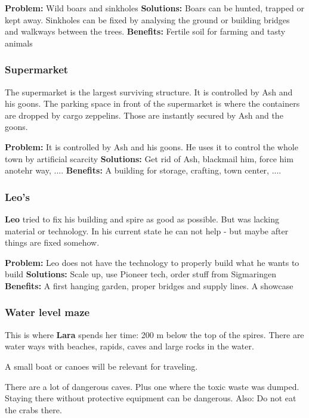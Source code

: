 \textbf{Problem:} Wild boars and sinkholes
\textbf{Solutions:} Boars can be hunted, trapped or kept away. Sinkholes can be fixed by analysing the ground or building bridges and walkways between the trees. 
\textbf{Benefits:} Fertile soil for farming and tasty animals

\subsubsection{Supermarket}

The supermarket is the largest surviving structure. It is controlled by Ash and his goons. The parking space in front of the supermarket is where the containers are dropped by cargo zeppelins. Those are instantly secured by Ash and the goons.

\textbf{Problem:} It is controlled by Ash and his goons. He uses it to control the whole town by artificial scarcity
\textbf{Solutions:} Get rid of Ash, blackmail him, force him anotehr way, ....
\textbf{Benefits:} A building for storage, crafting, town center, ....

\subsubsection{Leo's}

\textbf{Leo} tried to fix his building and spire as good as possible. But was lacking material or technology. In his current state he can not help - but maybe after things are fixed somehow.

\textbf{Problem:} Leo does not have the technology to properly build what he wants to build
\textbf{Solutions:} Scale up, use Pioneer tech, order stuff from Sigmaringen
\textbf{Benefits:} A first hanging garden, proper bridges and supply lines. A showcase

\subsubsection{Water level maze}

This is where \textbf{Lara} spends her time: 200 m below the top of the spires. There are water ways with beaches, rapids, caves and large rocks in the water.

A small boat or canoes will be relevant for traveling.

There are a lot of dangerous caves. Plus one where the toxic waste was dumped. Staying there without protective equipment can be dangerous. Also: Do not eat the crabs there.

